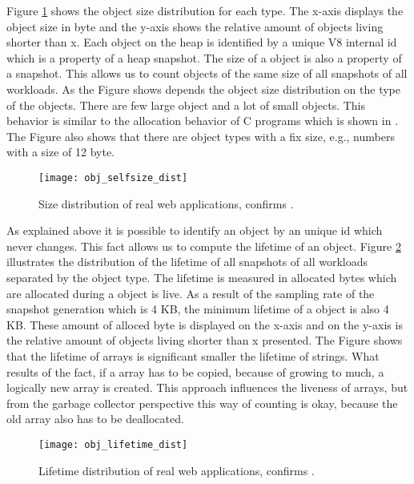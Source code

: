Figure \ref{fig:obj_selfsize_dist} shows the object size distribution for each type. The x-axis displays the object size in byte and the y-axis shows the relative amount of objects living shorter than x. Each object on the \JS heap is identified by a unique V8 internal id which is a property of a heap snapshot. The size of a object is also a property of a snapshot. This allows us to count objects of the same size of all snapshots of all workloads. As the Figure shows depends the object size distribution on the type of the objects. There are few large object and a lot of small objects. This behavior is similar to the allocation behavior of C programs which is shown in \cite{Aigner2013}. The Figure also shows that there are object types with a fix size, e.g., numbers with a size of 12 byte.
\begin{figure}
	\centering
	\texttt{[image: obj\_selfsize\_dist]}
	\caption{Size distribution of real web applications, confirms \cite{JSMeter2009}.}
	\label{fig:obj_selfsize_dist}
\end{figure}

As explained above it is possible to identify an object by an unique id which never changes. This fact allows us to compute the lifetime of an object. Figure \ref{fig:obj_lifetime_dist} illustrates the distribution of the lifetime of all snapshots of all workloads separated by the object type. The lifetime is measured in allocated bytes which are allocated during a object is live. As a result of the sampling rate of the snapshot generation which is 4 KB, the minimum lifetime of a object is also 4 KB. These amount of alloced byte is displayed on the x-axis and on the y-axis is the relative amount of objects living shorter than x presented. The Figure shows that the lifetime of arrays is significant smaller the lifetime of strings. What results of the fact, if a array has to be copied, because of growing to much, a logically new array is created. This approach influences the liveness of arrays, but from the garbage collector perspective this way of counting is okay, because the old array also has to be deallocated.
\begin{figure}
	\centering
	\texttt{[image: obj\_lifetime\_dist]}
	\caption{Lifetime distribution of real web applications, confirms \cite{JSMeter2009}.}
	\label{fig:obj_lifetime_dist}
\end{figure}

